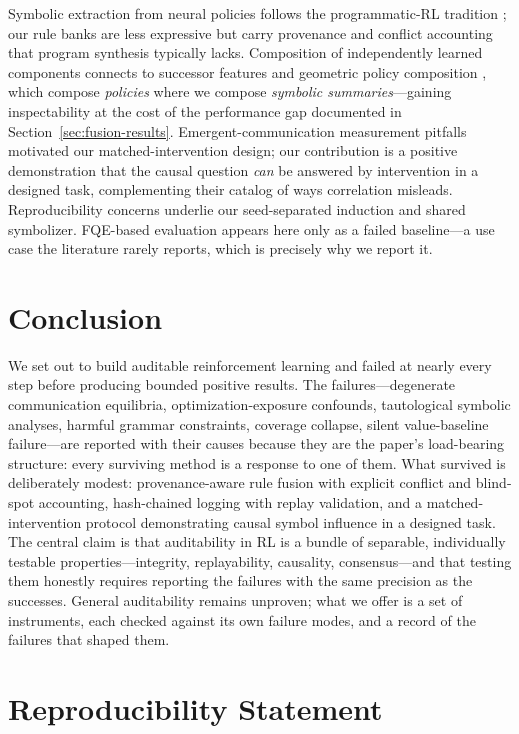 \documentclass[11pt]{article}
\begin{document}
Symbolic extraction from neural policies follows the programmatic-RL tradition \cite{verma2018}; our rule banks are less expressive but carry provenance and conflict accounting that program synthesis typically lacks. Composition of independently learned components connects to successor features \cite{barreto2017} and geometric policy composition \cite{thakoor2022}, which compose \textit{policies} where we compose \textit{symbolic summaries}---gaining inspectability at the cost of the performance gap documented in Section~\ref{sec:fusion-results}. Emergent-communication measurement pitfalls \cite{lowe2019} motivated our matched-intervention design; our contribution is a positive demonstration that the causal question \textit{can} be answered by intervention in a designed task, complementing their catalog of ways correlation misleads. Reproducibility concerns \cite{henderson2018,nagarajan2018} underlie our seed-separated induction and shared symbolizer. FQE-based evaluation \cite{le2019} appears here only as a failed baseline---a use case the literature rarely reports, which is precisely why we report it.

\section{Conclusion}

We set out to build auditable reinforcement learning and failed at nearly every step before producing bounded positive results. The failures---degenerate communication equilibria, optimization-exposure confounds, tautological symbolic analyses, harmful grammar constraints, coverage collapse, silent value-baseline failure---are reported with their causes because they are the paper's load-bearing structure: every surviving method is a response to one of them. What survived is deliberately modest: provenance-aware rule fusion with explicit conflict and blind-spot accounting, hash-chained logging with replay validation, and a matched-intervention protocol demonstrating causal symbol influence in a designed task. The central claim is that auditability in RL is a bundle of separable, individually testable properties---integrity, replayability, causality, consensus---and that testing them honestly requires reporting the failures with the same precision as the successes. General auditability remains unproven; what we offer is a set of instruments, each checked against its own failure modes, and a record of the failures that shaped them.

\section*{Reproducibility Statement}
\end{document}
